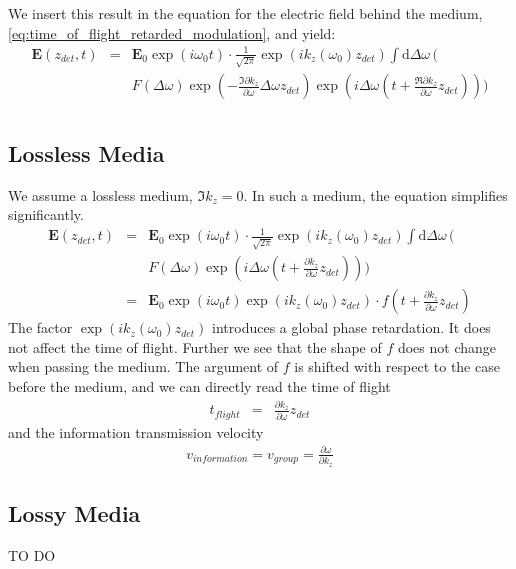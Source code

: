 \documentclass[12pt,a4paper,twoside,openright,BCOR10mm,headsepline,titlepage,abstracton,chapterprefix,final]{scrreprt}
\newcommand\Vector[1]{{\mathbf{#1}}}
\newcommand\wavenumber{k}
\newcommand\scalarEfield{E}
\newcommand\Efield{\Vector{\scalarEfield}}
\newcommand\totald{\textrm{d}}
\begin{document}
We insert this result in the equation for the electric field behind the medium, \eqref{eq:time_of_flight_retarded_modulation}, and yield:
\begin{eqnarray}
\Efield(z_{det}, t) &=& 
  \Efield_0 \exp ( i \omega_0 t)
  \cdot
     \frac{1}{\sqrt{2\pi}} \exp (i \wavenumber_z(\omega_0) z_{det})
     \int \totald\Delta\omega\,
     \Bigg( \nonumber\\&&
        F(\Delta \omega)
        \exp \left(- \frac{\Im \partial \wavenumber_z}{\partial \omega} \Delta \omega z_{det}\right)
        \exp \left( i \Delta \omega \left(t + \frac{\Re \partial \wavenumber_z}{\partial \omega} z_{det}\right)\right)
    \Bigg)
      \nonumber\\
\end{eqnarray}
\subsection{Lossless Media}
We assume a lossless medium, $\Im \wavenumber_z = 0$.
In such a medium, the equation simplifies significantly.
\begin{eqnarray}
\Efield(z_{det}, t) &=& 
  \Efield_0 \exp ( i \omega_0 t)
  \cdot
     \frac{1}{\sqrt{2\pi}} \exp (i \wavenumber_z(\omega_0) z_{det})
     \int \totald\Delta\omega\,
     \Bigg( \nonumber\\&&
        F(\Delta \omega)
        \exp \left( i \Delta \omega \left(t + \frac{ \partial \wavenumber_z}{\partial \omega} z_{det}\right)\right)
    \Bigg)
 \\
 &=&
 \Efield_0 \exp ( i \omega_0 t) \exp (i \wavenumber_z(\omega_0) z_{det}) 
 \cdot f\left(t + \frac{ \partial \wavenumber_z}{\partial \omega} z_{det}\right)
\end{eqnarray}
The factor $\exp (i \wavenumber_z(\omega_0) z_{det})$ introduces 
a global phase retardation. It does not affect the time of flight.
Further we see that the shape of $f$ does not change when passing the medium.
The argument of $f$ is shifted with respect to the case before the medium, and
we can directly read the time of flight
\begin{eqnarray}
 t_{flight} &=& \frac{ \partial \wavenumber_z}{\partial \omega} z_{det}
\end{eqnarray}
and the information transmission velocity
\begin{eqnarray}
 v_{information} = v_{group} = \frac{\partial \omega}{\partial \wavenumber_z}
\end{eqnarray}

\subsection{Lossy Media}
TO DO
\end{document}
